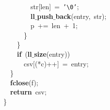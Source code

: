 \documentclass{article}
\begin{document}
$$\mbox{}\ \ \ \ \ \ \ \ str[len]\ =\ \texttt{'}\texttt{\textbackslash{}0}\texttt{'}; \\
\mbox{}\ \ \ \ \ \ \ \ \textbf{ll$\_$push$\_$back}(entry,\ str); \\
\mbox{}\ \ \ \ \ \ \ \ p\ +=\ len\ +\ 1; \\
\mbox{}\ \ \ \ \ \ \} \\
\mbox{}\ \ \ \ \} \\
\mbox{}\ \ \ \ \textbf{if}\ (\textbf{ll$\_$size}(entry)) \\
\mbox{}\ \ \ \ \ \ csv[(*c)++]\ =\ entry; \\
\mbox{}\ \ \} \\
\mbox{}\ \ \textbf{fclose}(f); \\
\mbox{}\ \ \textbf{return}\ csv; \\
\mbox{}\} \\
\mbox{}
\end{document}
